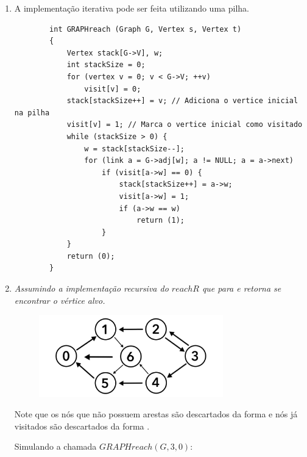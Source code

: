 \documentclass[12pt,letterpaper]{article}
\begin{document}
\begin{enumerate}
    \item A implementação iterativa pode ser feita utilizando uma pilha.
    \begin{lstlisting}
        int GRAPHreach (Graph G, Vertex s, Vertex t)
        {
            Vertex stack[G->V], w;
            int stackSize = 0;
            for (vertex v = 0; v < G->V; ++v)
                visit[v] = 0;
            stack[stackSize++] = v; // Adiciona o vertice inicial na pilha
            visit[v] = 1; // Marca o vertice inicial como visitado
            while (stackSize > 0) {
                w = stack[stackSize--];
                for (link a = G->adj[w]; a != NULL; a = a->next)
                    if (visit[a->w] == 0) {
                        stack[stackSize++] = a->w;
                        visit[a->w] = 1;
                        if (a->w == w)
                            return (1);
                    }
            }
            return (0);
        }
    \end{lstlisting}

    \item \textit{Assumindo a implementação recursiva do $reachR$ que para e retorna se encontrar o vértice alvo.}
    \begin{figure}[h]
    \includegraphics[width=8cm]{graph.png}
    \centering
    \end{figure}

    Note que os nós que não possuem arestas são descartados da forma  e nós já visitados são descartados da forma .

    Simulando a chamada $GRAPHreach(G, 3, 0)$:

\end{enumerate}
\end{document}
